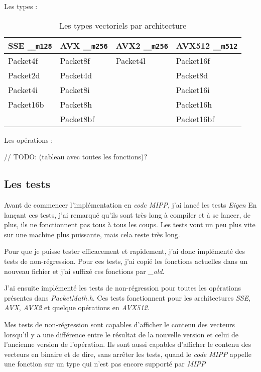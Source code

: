 Les types :

\begin{table}[H]
  \label{eigenTypesTable}
  \centering
  \begin{tabular}[H]{|l|l|l|l|}
    \hline
    \textbf{SSE} \verb|__m128| & \textbf{AVX} \verb|__m256| & \textbf{AVX2} \verb|__m256| & \textbf{AVX512} \verb|__m512|\\
    \hline
    Packet4f     & Packet8f     & Packet4l      & Packet16f       \\
    \hline
    Packet2d     & Packet4d     &               & Packet8d        \\
    \hline
    Packet4i     & Packet8i     &               & Packet16i       \\
    \hline
    Packet16b    & Packet8h     &               & Packet16h       \\
    \hline
                 & Packet8bf    &               & Packet16bf      \\
    \hline
  \end{tabular}
  \caption{Les types vectoriels \Eigen par architecture}
\end{table}

Les opérations :

// TODO: (tableau avec toutes les fonctions)?

\subsection{Les tests}

Avant de commencer l'implémentation en \emph{code MIPP}, j'ai lancé les tests \emph{Eigen}
En lançant ces tests, j'ai remarqué qu'ils sont très long à compiler et à se lancer, de
plus, ils ne fonctionnent pas tous à tous les coups. Les tests vont un peu plus vite sur
une machine plus puissante, mais cela reste très long.

Pour que je puisse tester efficacement et rapidement, j'ai donc implémenté des tests de non-régression.
Pour ces tests, j'ai copié les fonctions actuelles dans un nouveau fichier et
j'ai suffixé ces fonctions par \emph{_old}.

J'ai ensuite implémenté les tests de non-régression pour toutes les opérations présentes
dans \emph{PacketMath.h}. Ces tests fonctionnent pour les architectures \emph{SSE}, \emph{AVX},
\emph{AVX2} et quelque opérations en \emph{AVX512}.

Mes tests de non-régression sont capables d'afficher le contenu des vecteurs lorsqu'il y a
une différence entre le résultat de la nouvelle version et celui de l'ancienne version
de l'opération.
Ils sont aussi capables d'afficher le contenu des vecteurs en binaire et de dire, sans
arrêter les tests, quand le \emph{code MIPP} appelle une fonction \MIPP sur un type qui
n'est pas encore supporté par \emph{MIPP}

